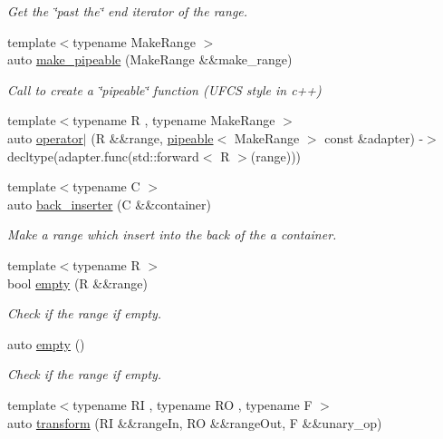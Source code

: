 \begin{DoxyCompactItemize}
\begin{DoxyCompactList}\small\item\em Get the \char`\"{}past the\char`\"{} end iterator of the range. \end{DoxyCompactList}\item 
{\footnotesize template$<$typename Make\+Range $>$ }\\auto \mbox{\hyperlink{namespacerah_a274b78c4c0af5dd58ce280f02223fb55}{make\+\_\+pipeable}} (Make\+Range \&\&make\+\_\+range)
\begin{DoxyCompactList}\small\item\em Call to create a \char`\"{}pipeable\char`\"{} function (U\+F\+CS style in c++) \end{DoxyCompactList}\item 
{\footnotesize template$<$typename R , typename Make\+Range $>$ }\\auto \mbox{\hyperlink{namespacerah_a5ebb23bb276c853ef14a86bed84b6df9}{operator$\vert$}} (R \&\&range, \mbox{\hyperlink{structrah_1_1pipeable}{pipeable}}$<$ Make\+Range $>$ const \&adapter) -\/$>$ decltype(adapter.\+func(std\+::forward$<$ R $>$(range)))
\item 
{\footnotesize template$<$typename C $>$ }\\auto \mbox{\hyperlink{namespacerah_a0698f952bc3c4f1961929bbddb5812fe}{back\+\_\+inserter}} (C \&\&container)
\begin{DoxyCompactList}\small\item\em Make a range which insert into the back of the a container. \end{DoxyCompactList}\item 
{\footnotesize template$<$typename R $>$ }\\bool \mbox{\hyperlink{namespacerah_a51feb1497566c28de396f50735fd259b}{empty}} (R \&\&range)
\begin{DoxyCompactList}\small\item\em Check if the range if empty. \end{DoxyCompactList}\item 
auto \mbox{\hyperlink{namespacerah_a6ceb90c934b1c4927ab4e08b985ef6c5}{empty}} ()
\begin{DoxyCompactList}\small\item\em Check if the range if empty. \end{DoxyCompactList}\item 
{\footnotesize template$<$typename RI , typename RO , typename F $>$ }\\auto \mbox{\hyperlink{namespacerah_a7cb27bf7219a7ee4b47cc9da217810a8}{transform}} (RI \&\&range\+In, RO \&\&range\+Out, F \&\&unary\+\_\+op)

\end{DoxyCompactItemize}
